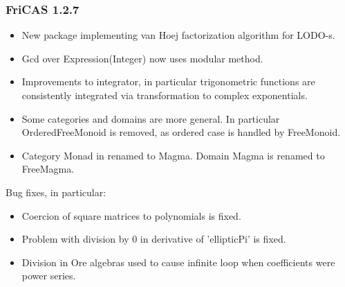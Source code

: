 \subsubsection{FriCAS 1.2.7}
\begin{itemize}

\item New package implementing van Hoej factorization algorithm
      for LODO-s.

\item Gcd over Expression(Integer) now uses modular method.

\item Improvements to integrator, in particular trigonometric
      functions are consistently integrated via transformation
      to complex exponentials.

\item Some categories and domains are more general.  In particular
      OrderedFreeMonoid is removed, as ordered case is handled
      by FreeMonoid.

\item Category Monad in renamed to Magma.  Domain Magma is
      renamed to FreeMagma.

\end{itemize}

Bug fixes, in particular:

\begin{itemize}

\item Coercion of square matrices to polynomials is fixed.

\item Problem with division by 0 in derivative of 'ellipticPi'
      is fixed.

\item Division in Ore algebras used to cause infinite loop
      when coefficients were power series.

\end{itemize}

